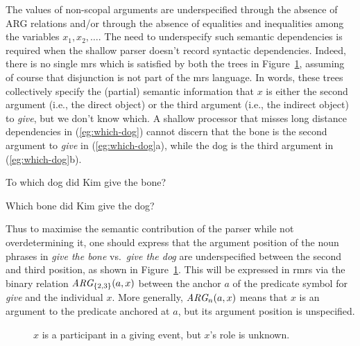 The values of non-scopal arguments are underspecified through the
absence of ARG relations and/or through the absence of
equalities and inequalities among the variables $x_1, x_2,\ldots$.
The need to
underspecify such semantic dependencies is required when
the shallow parser doesn't record syntactic dependencies.
Indeed, there is no single {\sc mrs} which is satisfied by both the
trees in Figure~\ref{fig:2}, assuming of course that disjunction is not part of
the {\sc mrs} language.  In words, these trees collectively specify
the (partial) semantic information that $x$ is either the second
argument (i.e., the direct object) or the third argument (i.e., the
indirect object) to {\em give}, but we don't know which.  
A shallow
processor that misses long distance dependencies in
(\ref{eg:which-dog}) cannot
discern that the bone is the second argument to {\em
  give} in (\ref{eg:which-dog}a), while the dog is the third argument
in (\ref{eg:which-dog}b).
\begin{examples}
\item   \label{eg:which-dog}
\begin{subexamples}
\item   To which dog did Kim give the bone?
\item   Which bone did Kim give the dog?
\end{subexamples}
\end{examples}
Thus to maximise the semantic contribution
of the parser while not overdetermining it, one should express that
the argument position of the noun phrases in {\em give the bone} vs.\
{\em give the dog} are underspecified between the second and third
position, as shown in Figure~\ref{fig:2}.   This will be expressed in
{\sc rmrs} via the binary relation  $\mbox{{\em ARG}}_{\{2,3\}}(a,x)$
between the anchor $a$ of the predicate symbol for {\em give} and the
individual $x$.   More generally, $\mbox{{\em ARG}}_n(a,x)$ means that
$x$ is an argument to the predicate anchored at $a$, but its argument
position is unspecified.

\begin{figure}

\leaf{$\ldots$}
\leaf{$\ldots$}
\tree
\hfill
{}
\leaf{$\ldots$}
\leaf{$\ldots$}
\tree

\caption{$x$ is a participant in a
  giving event, but $x$'s role is unknown.}
\label{fig:2}
\end{figure}

